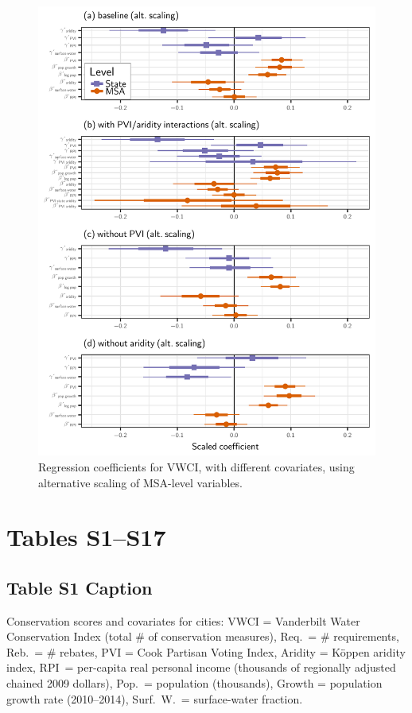 \documentclass[draft]{agujournal}\usepackage{knitr}
\begin{document}
\begin{figure}
\includegraphics[width=6.25in]{figures_si/pooled_vwci_pvi_cat_plots-1} \caption[Regression coefficients for VWCI, with different covariates, using alternative scaling of MSA-level variables]{Regression coefficients for VWCI, with different covariates, using alternative scaling of MSA-level variables.}\label{fig:pooled_vwci_pvi_cat_plots}
\end{figure}



\clearpage
\section{Tables S1--S17}
\subsection*{Table S1 Caption}
\begin{table}[H]
\centering
\caption{Conservation scores and covariates for  cities: VWCI = Vanderbilt Water Conservation Index (total \# of conservation measures), Req.\ = \# requirements, Reb.\ = \# rebates, PVI = Cook Partisan Voting Index, Aridity = K\"oppen aridity index, RPI\ = per-capita real personal income (thousands of regionally adjusted chained 2009 dollars), Pop.\ = population (thousands), Growth = population growth rate (2010--2014), Surf.\ W.\ = surface-water fraction.}
\label{tab:vwci}
\end{table}
\end{document}
